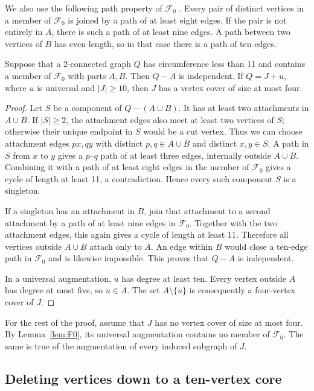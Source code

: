 \documentclass[12pt]{article}
\newcommand{\Fzero}{\mathcal F_0}
\begin{document}
We also use the following path property of $\Fzero$
\cite[Lemma~4.8]{fkv}. Every pair of distinct vertices in a
member of $\Fzero$ is joined by a path of at least eight edges.
If the pair is not entirely in $A$, there is such a path of at
least nine edges. A path between two vertices of $B$ has even
length, so in that case there is a path of ten edges.

\begin{lemma}\label{lem:F0}
Suppose that a 2-connected graph $Q$ has circumference less than
11 and contains a member of $\Fzero$ with parts $A,B$.
Then $Q-A$ is independent. If $Q=J+u$, where $u$ is universal
and $|J|\geq10$, then $J$ has a vertex cover of size at most four.
\end{lemma}

\begin{proof}
Let $S$ be a component of $Q-(A\cup B)$. It has at least two
attachments in $A\cup B$. If $|S|\geq2$, the attachment edges
also meet at least two vertices of $S$; otherwise their unique
endpoint in $S$ would be a cut vertex. Thus we can choose
attachment edges $px,qy$ with distinct $p,q\in A\cup B$
and distinct $x,y\in S$. A path in $S$ from $x$ to $y$
gives a $p$--$q$ path of at least three edges, internally
outside $A\cup B$. Combining it with a path of at least eight edges
in the member of $\Fzero$ gives a cycle of length at least
11, a contradiction. Hence every such component $S$ is
a singleton.

If a singleton has an attachment in $B$, join that attachment
to a second attachment by a path of at least nine edges in
$\Fzero$. Together with the two attachment edges, this again
gives a cycle of length at least 11. Therefore all vertices
outside $A\cup B$ attach only to $A$.
An edge within $B$ would close a ten-edge path in $\Fzero$
and is likewise impossible. This proves that $Q-A$ is
independent.

In a universal augmentation, $u$ has degree at least ten.
Every vertex outside $A$ has degree at most five, so $u\in A$.
The set $A\setminus\{u\}$ is consequently a four-vertex cover
of $J$.
\end{proof}

For the rest of the proof, assume that $J$ has no vertex cover
of size at most four. By Lemma~\ref{lem:F0}, its universal
augmentation contains no member of $\Fzero$. The same is
true of the augmentation of every induced subgraph of $J$.

\subsection{Deleting vertices down to a ten-vertex core}
\end{document}
